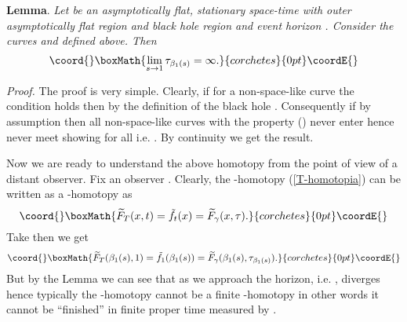 \documentclass[a4paper,12pt,draft]{article}
\providecommand{\R}{{\mathbb R}}
\begin{document}
{\bf Lemma}. {\it Let \coordHE{} be an asymptotically flat, stationary
space-time with outer asymptotically flat region \coordHE{} and black hole
region \coordHE{} and event horizon \coordHE{}. Consider the
curves \coordHE{} and \myHighlight{$\gamma :\R^+\rightarrow N$}\coordHE{}
defined above. Then}
\[\coord{}\boxMath{\lim\limits_{s\rightarrow 1}\tau_{\beta_1(s)}=\infty .}{corchetes}{0pt}\coordE{}\]


{\it Proof.} The proof is very simple. Clearly, if for a non-space-like
curve \myHighlight{$\alpha :\R\rightarrow M$}\coordHE{} the condition \coordHE{} holds then \coordHE{} by the definition
of the black hole \coordHE{}. Consequently if by assumption
\coordHE{} then all non-space-like curves \myHighlight{$\alpha$}\coordHE{} with
the property \coordHE{} (\myHighlight{$\tau '\in\R$}\coordHE{}) never enter \coordHE{}
hence never meet \myHighlight{$\gamma$}\coordHE{} showing \coordHE{}
for all \myHighlight{$\tau\in\R^+$}\coordHE{} i.e. \coordHE{}. By continuity
we get the result. \myHighlight{$\Diamond$}\coordHE{}
\vspace{0.1in}
  
\noindent Now we are ready to understand the above homotopy from the
point of view of a distant observer. Fix an observer \myHighlight{$\gamma$}\coordHE{}. Clearly,
the \coordHE{}-homotopy (\ref{T-homotopia}) can be written as a
\myHighlight{$\gamma$}\coordHE{}-homotopy as
\[\coord{}\boxMath{\widetilde{F}_T(x,t)=\tilde{f}_t(x)=\widetilde{F}_{\gamma}(x, \tau ).}{corchetes}{0pt}\coordE{}\]
Take \coordHE{} then we get
\[\coord{}\boxMath{\widetilde{F}_T(\beta_1(s),
1)=\tilde{f}_1(\beta_1(s))=\widetilde{F}_\gamma (\beta_1(s),
\tau_{\beta_1(s)}).}{corchetes}{0pt}\coordE{}\]
But by the Lemma we can see that as we approach the horizon, i.e.
\coordHE{}, \coordHE{} diverges hence typically the
\coordHE{}-homotopy cannot be a finite \myHighlight{$\gamma$}\coordHE{}-homotopy in other
words it cannot be ``finished'' in finite proper time measured by
\myHighlight{$\gamma$}\coordHE{}.
\end{document}
